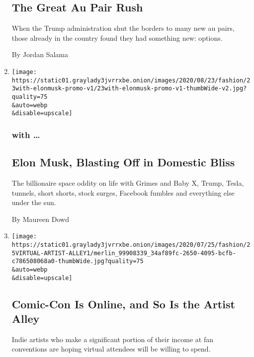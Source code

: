 \begin{enumerate}
  \hypertarget{the-great-au-pair-rush}{%
  \subsection{The Great Au Pair Rush}\label{the-great-au-pair-rush}}

  When the Trump administration shut the borders to many new au pairs,
  those already in the country found they had something new: options.

  By Jordan Salama
\item
  \href{/2020/07/25/style/elon-musk-maureen-dowd.html}{}

  \texttt{[image: https://static01.graylady3jvrrxbe.onion/images/2020/08/23/fashion/23with-elonmusk-promo-v1/23with-elonmusk-promo-v1-thumbWide-v2.jpg?quality=75\\\&auto=webp\\\&disable=upscale]}

  \hypertarget{with-}{%
  \subsubsection{with \ldots{}}\label{with-}}

  \hypertarget{elon-musk-blasting-off-in-domestic-bliss}{%
  \subsection{Elon Musk, Blasting Off in Domestic
  Bliss}\label{elon-musk-blasting-off-in-domestic-bliss}}

  The billionaire space oddity on life with Grimes and Baby X, Trump,
  Tesla, tunnels, short shorts, stock surges, Facebook fumbles and
  everything else under the sun.

  By Maureen Dowd
\item
  \href{/2020/07/25/style/comic-con-online-artist-alley.html}{}

  \texttt{[image: https://static01.graylady3jvrrxbe.onion/images/2020/07/25/fashion/25VIRTUAL-ARTIST-ALLEY1/merlin\_99908339\_34af89fc-2650-4095-bcfb-c786508068a0-thumbWide.jpg?quality=75\\\&auto=webp\\\&disable=upscale]}

  \hypertarget{comic-con-is-online-and-so-is-the-artist-alley}{%
  \subsection{Comic-Con Is Online, and So Is the Artist
  Alley}\label{comic-con-is-online-and-so-is-the-artist-alley}}

  Indie artists who make a significant portion of their income at fan
  conventions are hoping virtual attendees will be willing to spend.


\end{enumerate}
